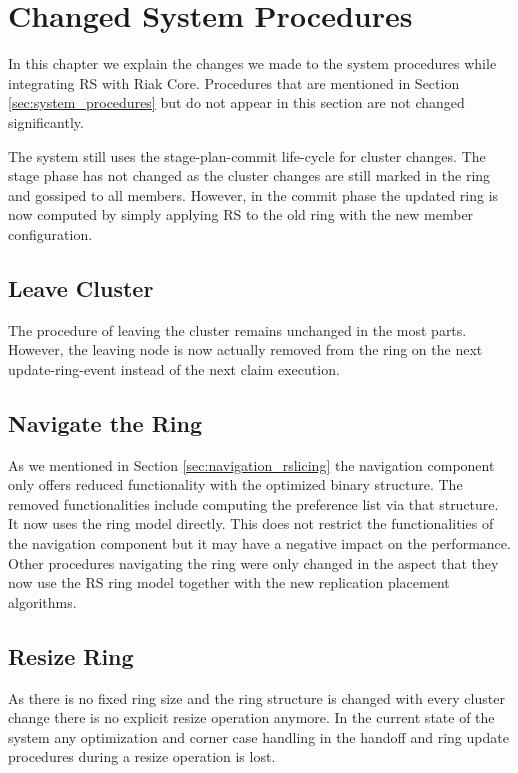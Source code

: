 \section{Changed System Procedures}
In this chapter we explain the changes we made to the system procedures while integrating \ac{RS} with Riak Core.
Procedures that are mentioned in Section \ref{sec:system_procedures} but do not appear in this section are not changed significantly.

The system still uses the stage-plan-commit life-cycle for cluster changes. The stage phase has not changed as the cluster changes are still marked in the ring and gossiped to all members.
However, in the commit phase the updated ring is now computed by simply applying \ac{RS} to the old ring with the new member configuration.

\subsection{Leave Cluster}
The procedure of leaving the cluster remains unchanged in the most parts.
However, the leaving node is now actually removed from the ring on the next update-ring-event instead of the next claim execution.

\subsection{Navigate the Ring}
As we mentioned in Section \ref{sec:navigation_rslicing} the navigation component only offers reduced functionality with the optimized binary structure.
The removed functionalities include computing the preference list via that structure.
It now uses the ring model directly.
This does not restrict the functionalities of the navigation component but it may have a negative impact on the performance.
Other procedures navigating the ring were only changed in the aspect that they now use the \ac{RS} ring model together with the new replication placement algorithms.

\subsection{Resize Ring}
As there is no fixed ring size and the ring structure is changed with every cluster change there is no explicit resize operation anymore.
In the current state of the system any optimization and corner case handling in the handoff and ring update procedures during a resize operation is lost.

